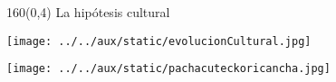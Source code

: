\documentclass[shownotes,aspectratio=169]{beamer}
\newif\ifen
\newif\ifes
\newcommand{\en}[1]{\ifen#1\fi}
\newcommand{\es}[1]{\ifes#1\fi}
\begin{document}
\begin{frame}[plain]
\begin{textblock}{160}(0,4)
 \centering \LARGE 
 La hipótesis cultural
 \end{textblock}
\vspace{1cm}

\texttt{[image: ../../aux/static/evolucionCultural.jpg]}

\end{frame}
% 
%  
% 
% 
%  
% 
% 

 
\begin{frame}[plain]
\centering
  \texttt{[image: ../../aux/static/pachacuteckoricancha.jpg]}
\end{frame}
\end{document}
